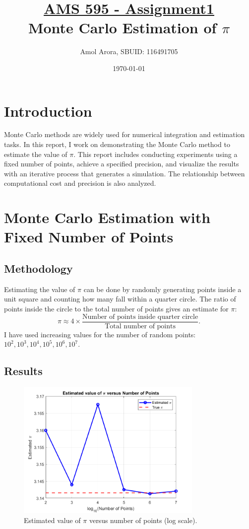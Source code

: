 \documentclass{article}
\title{\underline{AMS 595 - Assignment1} \\ Monte Carlo Estimation of $\pi$}
\author{Amol Arora, SBUID: 116491705}
\date{\today}
\begin{document}
\maketitle

\tableofcontents

\section{Introduction}
Monte Carlo methods are widely used for numerical integration and estimation tasks. In this report, I work on demonstrating the Monte Carlo method to estimate the value of $\pi$. This report includes conducting experiments using a fixed number of points, achieve a specified precision, and visualize the results with an iterative process that generates a simulation. The relationship between computational cost and precision is also analyzed.

\section{Monte Carlo Estimation with Fixed Number of Points}
\subsection{Methodology}
Estimating the value of $\pi$ can be done by randomly generating points inside a unit square and counting how many fall within a quarter circle. The ratio of points inside the circle to the total number of points gives an estimate for $\pi$:
\[
\pi \approx 4 \times \frac{\text{Number of points inside quarter circle}}{\text{Total number of points}}.
\]
I have used increasing values for the number of random points: $10^2, 10^3, 10^4, 10^5, 10^6, 10^7$.

\subsection{Results}
\begin{figure}[h!]
    \centering
    \includegraphics[width=0.8\textwidth]{pi_estimation_plot.png}
    \caption{Estimated value of $\pi$ versus number of points (log scale).}
    \label{fig:pi_estimation}
\end{figure}
\end{document}
